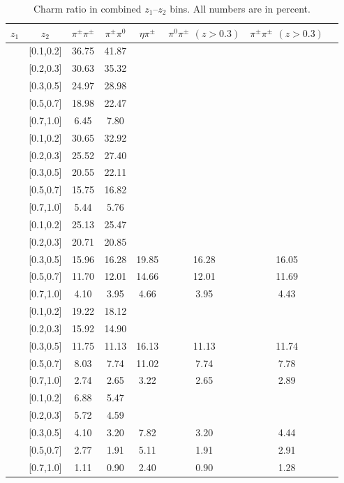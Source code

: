 \documentclass[aps,prX,preprint,groupedaddress,linenumbers]{revtex4-1}
\begin{document}
\begin{table}[h]
\centering
\begin{tabular}{|c|c||c|c|c|c|c|c|}
\hline
 $z_1$& $z_2$ & $\pi^{\pm}\pi^{\pm}$ & $\pi^{\pm}\pi^0$ & $\eta\pi^{\pm}$ & $\pi^0\pi^{\pm}$ $(z>0.3)$ & $\pi^{\pm}\pi^{\pm}$ $(z>0.3)$ \\ \hline\hline
[0.1,0.2]	&	[0.1,0.2]	&	36.75	&	41.87	&		&		&		\\ \hline
[0.1,0.2]	&	[0.2,0.3]	&	30.63	&	35.32	&		&		&		\\ \hline
[0.1,0.2]	&	[0.3,0.5]	&	24.97	&	28.98	&		&		&		\\ \hline
[0.1,0.2]	&	[0.5,0.7]	&	18.98	&	22.47	&		&		&		\\ \hline
[0.1,0.2]	&	[0.7,1.0]	&	6.45	&	7.80	&		&		&		\\ \hline \hline
[0.2,0.3]	&	[0.1,0.2]	&	30.65	&	32.92	&		&		&		\\ \hline
[0.2,0.3]	&	[0.2,0.3]	&	25.52	&	27.40	&		&		&		\\ \hline
[0.2,0.3]	&	[0.3,0.5]	&	20.55	&	22.11	&		&		&		\\ \hline
[0.2,0.3]	&	[0.5,0.7]	&	15.75	&	16.82	&		&		&		\\ \hline
[0.2,0.3]	&	[0.7,1.0]	&	5.44	&	5.76	&		&		&		\\ \hline\hline
[0.3,0.5]	&	[0.1,0.2]	&	25.13	&	25.47	&		&		&		\\ \hline
[0.3,0.5]	&	[0.2,0.3]	&	20.71	&	20.85	&		&		&		\\ \hline
[0.3,0.5]	&	[0.3,0.5]	&	15.96	&	16.28	&	19.85	&	16.28	&	16.05	\\ \hline
[0.3,0.5]	&	[0.5,0.7]	&	11.70	&	12.01	&	14.66	&	12.01	&	11.69	\\ \hline
[0.3,0.5]	&	[0.7,1.0]	&	4.10	&	3.95	&	4.66	&	3.95	&	4.43	\\ \hline\hline
[0.5,0.7]	&	[0.1,0.2]	&	19.22	&	18.12	&		&		&		\\ \hline
[0.5,0.7]	&	[0.2,0.3]	&	15.92	&	14.90	&		&		&		\\ \hline
[0.5,0.7]	&	[0.3,0.5]	&	11.75	&	11.13	&	16.13	&	11.13	&	11.74	\\ \hline
[0.5,0.7]	&	[0.5,0.7]	&	8.03	&	7.74	&	11.02	&	7.74	&	7.78	\\ \hline
[0.5,0.7]	&	[0.7,1.0]	&	2.74	&	2.65	&	3.22	&	2.65	&	2.89	\\ \hline\hline
[0.7,1.0]	&	[0.1,0.2]	&	6.88	&	5.47	&		&		&		\\ \hline
[0.7,1.0]	&	[0.2,0.3]	&	5.72	&	4.59	&		&		&		\\ \hline
[0.7,1.0]	&	[0.3,0.5]	&	4.10	&	3.20	&	7.82	&	3.20	&	4.44	\\ \hline
[0.7,1.0]	&	[0.5,0.7]	&	2.77	&	1.91	&	5.11	&	1.91	&	2.91	\\ \hline
[0.7,1.0]	&	[0.7,1.0]	&	1.11	&	0.90	&	2.40	&	0.90	&	1.28	\\ \hline
\end{tabular}
\caption[Charm ratio in combined $z_{1}$--$z_{2}$ bins]{Charm ratio in combined $z_{1}$--$z_{2}$ bins. All numbers are in percent.}
\label{tab:comzcharmratio}
\end{table}
\end{document}
